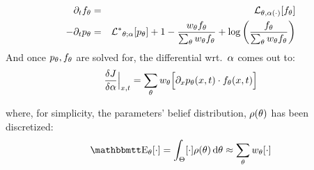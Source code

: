 \documentclass{beamer}
\begin{document}
\begin{frame}
\begin{eqnarray*}
{\partial}_t { f_{\theta}}  
&=& { \mathcal{L} }_{{\theta}, {\alpha}(\cdot)}[{ f_{\theta}}]
\\
-{\partial}_t { p_{\theta}} &=& 
{ { \mathcal{L} }^* }_{{\theta};{\alpha}} [p_{\theta}] +   
1 - \frac{  w_{\theta} { f_{\theta}} }{\sum_{\theta} w_{\theta}{ f_{\theta}}} 
+ \log\left(\frac{f_{\theta}} {\sum_{\theta} { w_{\theta} } { f_{\theta}} }\right)   
\end{eqnarray*}
And once ${ p_{\theta}}, { f_{\theta}}$ are solved for, the differential wrt.\ ${\alpha}$ comes
out to:
$$
\frac {\delta J}{\delta {\alpha}} \Big|_{x,t} = \sum_\theta { w_{\theta}}  \Big[{\partial}_x { p_{\theta}}(x,t) \cdot
{ f_{\theta}}(x,t) \Big] $$

\vskip 10pt

where, for simplicity, the parameters' belief distribution, $\rho({\theta})$ has
been discretized: 
$$
\Exp_\th[\cdot] = \int_\Theta [\cdot ] \rho(\th)\intd{\th} \approx \sum_\th\wt 
[\cdot] $$
\pause


\end{frame}
\end{document}
